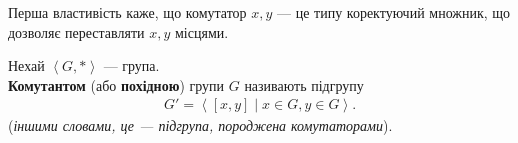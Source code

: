 \documentclass{math_library}
\begin{document}

\begin{remark}
Перша властивість каже, що комутатор $x,y$ --- це типу коректуючий множник, що дозволяє переставляти $x,y$ місцями.
\end{remark}

\begin{definition}
Нехай $\left<G,*\right>$ --- група.\\
\textbf{Комутантом} (або \textbf{похідною}) групи $G$ називають підгрупу
\begin{align*}
G' = \left< [x,y] \mid x \in G, y \in G \right>.
\end{align*}
(\textit{іншими словами, це --- підгрупа, породжена комутаторами}).
\end{definition}
\end{document}
